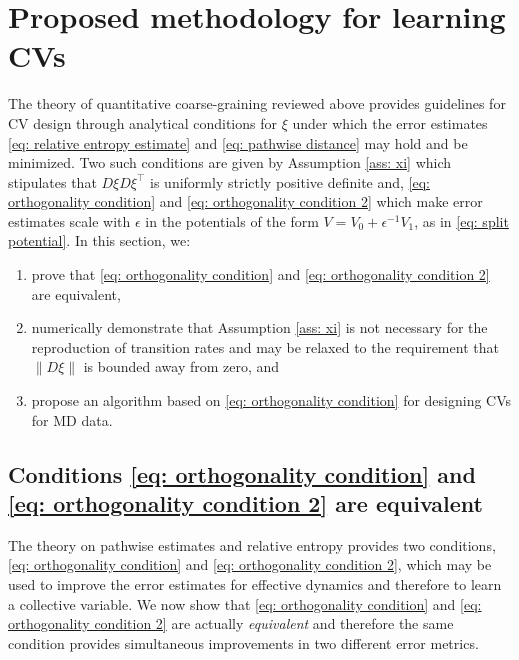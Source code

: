 \documentclass[reqno, 12pt]{article}
\begin{document}

\section{Proposed methodology for learning CVs}
\label{sec: effective dynamics analysis}
The theory of quantitative coarse-graining reviewed above provides guidelines for CV design through analytical conditions for $\xi$ under which the error estimates \eqref{eq: relative entropy estimate} and \eqref{eq: pathwise distance} may hold and be minimized. Two such conditions are given by Assumption \eqref{ass: xi} which stipulates that $D\xi D\xi^{\top}$ is uniformly strictly positive definite and, \eqref{eq: orthogonality condition} and \eqref{eq: orthogonality condition 2} which make error estimates scale with $\epsilon$ in the potentials of the form $V = V_0 + \epsilon^{-1}V_1$, as in \eqref{eq: split potential}. In this section, we: 
\begin{enumerate}
    \item prove that \eqref{eq: orthogonality condition} and \eqref{eq: orthogonality condition 2} are equivalent, 
    \item numerically demonstrate that Assumption \ref{ass: xi} is not necessary for the reproduction of transition rates and may be relaxed to the requirement that $\|D\xi\|$ is bounded away from zero,
    and
    \item propose an algorithm based on \eqref{eq: orthogonality condition} for designing CVs for MD data. 
\end{enumerate}


\subsection{Conditions \eqref{eq: orthogonality condition} and \eqref{eq: orthogonality condition 2} are equivalent}

The theory on pathwise estimates and relative entropy provides two conditions, \eqref{eq: orthogonality condition} and \eqref{eq: orthogonality condition 2}, which may be used to improve the error estimates for effective dynamics and therefore to learn a collective variable. We now show that \eqref{eq: orthogonality condition} and \eqref{eq: orthogonality condition 2} are actually \emph{equivalent} and therefore the same condition provides simultaneous improvements in two different error metrics.
\end{document}
